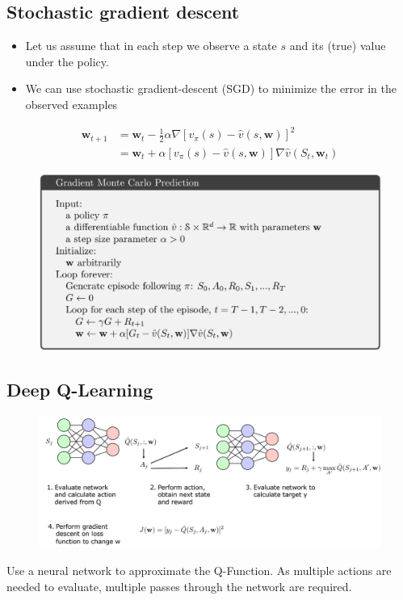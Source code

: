 \subsection{Stochastic gradient descent}
\begin{itemize}
    \item Let us assume that in each step we observe a state \(s\) and its (true) value under the policy.
    \item We can use stochastic gradient-descent (SGD) to minimize the error in the observed examples
\end{itemize}
\begin{align*}
    \boldsymbol{w}_{t+1} &= \boldsymbol{w}_t - \frac{1}{2}\alpha\nabla\left[v_\pi(s)-\hat{v}(s,\boldsymbol{w})\right]^2\\
    &= \boldsymbol{w}_t + \alpha\left[v_\pi(s)-\hat{v}(s,\boldsymbol{w})\right]\nabla\hat{v}(S_t,\boldsymbol{w}_t)
\end{align*}
\begin{figure}[h]
    \includegraphics[width = \columnwidth]{figures/DeepReinforcementLearning2/GDMonteCarlo.png}
\end{figure}

\subsection{Deep Q-Learning}
\begin{figure}[!h]
    \includegraphics[width = \columnwidth]{figures/DeepReinforcementLearning2/BasicDeepQLearning.png}
\end{figure}
Use a neural network to approximate the Q-Function.
As multiple actions are needed to evaluate, multiple passes through the network are required.

